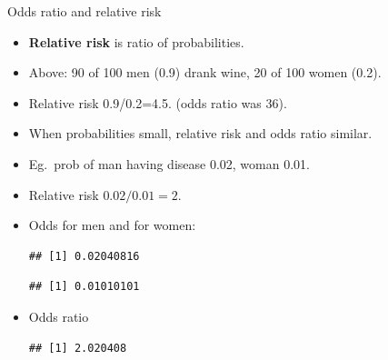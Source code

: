 \begin{frame}[fragile]{Odds ratio and relative risk}
  
  \begin{itemize}
  \item \textbf{Relative risk} is ratio of probabilities.
  \item Above: 90 of 100 men (0.9) drank wine, 20 of 100 women (0.2).
  \item Relative risk 0.9/0.2=4.5. (odds ratio was 36).
  \item When probabilities small, relative risk and odds ratio similar.
  \item Eg.\ prob of man having disease 0.02, woman 0.01.
  \item Relative risk $0.02/0.01=2$.
  \item Odds for men and for women:
 
\begin{knitrout}
\color{fgcolor}\begin{kframe}
\begin{alltt}
\hlkwb{=}\hlopt{/}\hlstd{)}
\end{alltt}
\begin{verbatim}
## [1] 0.02040816
\end{verbatim}
\begin{alltt}
\hlkwb{=}\hlopt{/}\hlstd{)}
\end{alltt}
\begin{verbatim}
## [1] 0.01010101
\end{verbatim}
\end{kframe}
\end{knitrout}

\item Odds ratio 
 
\begin{knitrout}
\color{fgcolor}\begin{kframe}
\begin{alltt}
\hlopt{/} 
\end{alltt}
\begin{verbatim}
## [1] 2.020408
\end{verbatim}
\end{kframe}
\end{knitrout}
  
    
  \end{itemize}
  
\end{frame}



